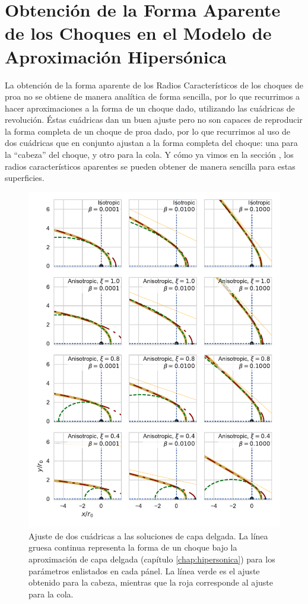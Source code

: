 \chapter{Obtención de la Forma Aparente de los Choques en el Modelo de Aproximación Hipersónica}
La obtención de la forma aparente de los Radios Característicos de los choques de proa no se obtiene de manera analítica de forma sencilla, por lo que recurrimos a hacer aproximaciones a la forma de un choque dado, utilizando las cuádricas de revolución. Éstas cuádricas dan un buen ajuste pero no son capaces de reproducir la forma completa de un choque de proa dado, por lo que recurrimos al uso de dos cuádricas que en conjunto ajustan a la forma completa del choque: una para la ``cabeza'' del choque, y otro para la cola. Y cómo ya vimos en la sección , los radios característicos aparentes se pueden obtener de manera sencilla para estas superficies.

\begin{figure}
  \includegraphics[width = 0.8\linewidth]{./Figures/conic-head-tail-analytic}
  \caption{Ajuste de dos cuádricas a las soluciones de capa delgada. La línea gruesa continua representa la forma de un choque bajo la aproximación de capa delgada (capítulo \ref{chap:hipersonica}) para los parámetros enlistados en cada pánel. La línea verde es el ajuste obtenido para la cabeza, mientras que la roja corresponde al ajuste para la cola.}
  \label{fig:conic-head-tail-fit}
\end{figure}

